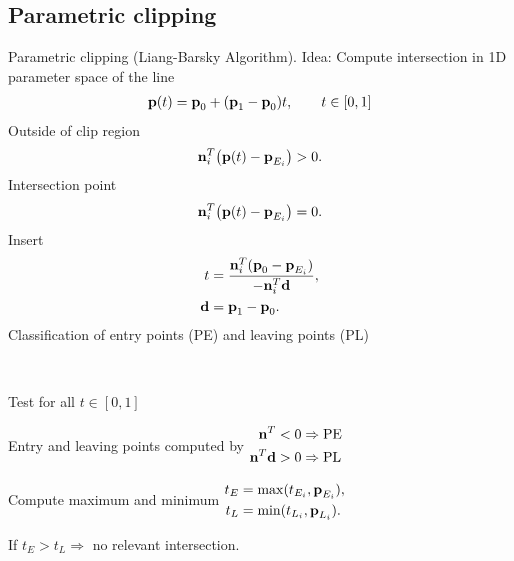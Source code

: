 \begin{compactdesc}
\section{Parametric clipping}
Parametric clipping (Liang-Barsky Algorithm). Idea: Compute intersection in 1D parameter space of the line
	\begin{gather*}
		\bm{\mathrm{p}}(t)=\bm{\mathrm{p}}_0+(\bm{\mathrm{p}}_1-\bm{\mathrm{p}}_0)t,\qquad t\in[0,1]
	\end{gather*}
	Outside of clip region
	\begin{gather*}
		\bm{\mathrm{n}}_{i}^{T}\!\left( \bm{\mathrm{p}}(t)-\bm{\mathrm{p}}_{E_i} \right)>0.
	\end{gather*}
Intersection point
\begin{gather*}
	\bm{\mathrm{n}}_{i}^{T}\!\left(\bm{\mathrm{p}}(t)-\bm{\mathrm{p}}_{E_i}  \right)=0.
\end{gather*}
Insert
\begin{align*}
	t&=\frac{\bm{\mathrm{n}}_{i}^{T}(\bm{\mathrm{p}}_0-\bm{\mathrm{p}}_{E_i})}{-\bm{\mathrm{n}}_{i}^{T}\bm{\mathrm{d}}},\\
	\bm{\mathrm{d}}&=\bm{\mathrm{p}}_1-\bm{\mathrm{p}}_0.
\end{align*}
Classification of entry points (PE) and leaving points (PL)
	\item[\lp{Algorithm}]\hfill\\
		\begin{enumerate*}[label=\protect\circled{\arabic*},itemjoin=]
			\item Test for all $t\in[0,1]$\\
			\item Entry and leaving points computed by 
				$\centering
				\begin{aligned}
					\vtr{n}^{T}&<0 \Rightarrow \text{PE}\\
					\vtr{n}^{T}\vtr{d}&>0\Rightarrow\text{PL}
				\end{aligned}
				$
			\item Compute maximum and minimum
				$
				\begin{aligned}
					t_{E}&=\max(t_{E_i},\bm{\mathrm{p}}_{E_i}),\\
					t_{L}&=\min(t_{L_i},\bm{\mathrm{p}}_{L_i}).
				\end{aligned}
				$\\
			\item If $t_{E}>t_L \Rightarrow$ no relevant intersection. 
		\end{enumerate*}
		\begin{lstlisting}

\end{lstlisting}
\end{compactdesc}
